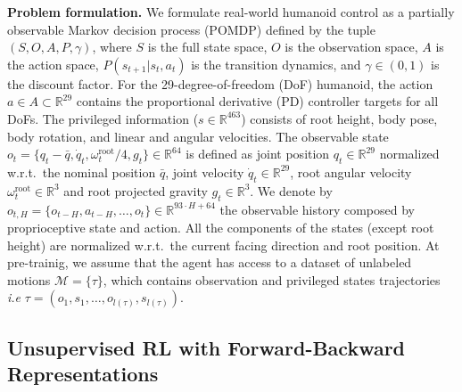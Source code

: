 \textbf{Problem formulation.} We formulate real-world humanoid control as a partially observable Markov decision process (POMDP) defined by the tuple $(S, O, A, P, \gamma)$, where $S$ is the full state space, $O$ is the observation space, $A$ is the action space, $P(s_{t+1}|s_t,a_t)$ is the transition dynamics, and $\gamma \in (0,1)$ is the discount factor. For the 29-degree-of-freedom (DoF) humanoid, the action $a\in A \subset \mathbb{R}^{29}$ contains the proportional derivative (PD) controller targets for all DoFs. The privileged information  ($s \in \mathbb{R}^{463}$) consists of root height, body pose, body rotation, and linear and angular velocities. The observable state $o_t = \{q_t - \bar{q}, \dot{q}_t, \omega^{\mathrm{root}}_t / 4, g_t\} \in \mathbb{R}^{64}$ is defined as joint position $q_t \in \mathbb{R}^{29}$ normalized w.r.t.\ the nominal position $\bar{q}$, joint velocity $\dot{q}_t \in \mathbb{R}^{29}$, root angular velocity $\omega^{\mathrm{root}}_t \in\mathbb{R}^3$ and root projected gravity $g_t \in\mathbb{R}^3$. We denote by $o_{t,H} = \{o_{t-H}, a_{t-H},  \ldots, o_t\}\in \mathbb{R}^{93\cdot H + 64}$ the observable history composed by proprioceptive state and action. 
All the components of the states (except root height) are normalized w.r.t.\ the current facing direction and root position.
At pre-trainig, we assume that the agent has  access to a dataset of unlabeled motions $\mathcal{M} = \{ \tau\}$, which contains observation and privileged states trajectories \textit{i.e} $\tau = (o_1, s_1, \ldots, o_{l(\tau)}, s_{l(\tau)})$.  

\subsection{Unsupervised RL with Forward-Backward Representations}
\label{sec:prelim}
\vspace{-2mm}



